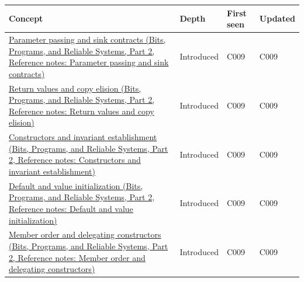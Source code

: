 {\def\LTcaptype{none} %
\begin{longtable}[]{@{}
  >{\raggedright\arraybackslash}p{}
  >{\raggedright\arraybackslash}p{}
  >{\raggedright\arraybackslash}p{}
  >{\raggedright\arraybackslash}p{}@{}}
\toprule\noalign{}
\begin{minipage}[b]{\linewidth}\raggedright
Concept
\end{minipage} & \begin{minipage}[b]{\linewidth}\raggedright
Depth
\end{minipage} & \begin{minipage}[b]{\linewidth}\raggedright
First seen
\end{minipage} & \begin{minipage}[b]{\linewidth}\raggedright
Updated
\end{minipage} \\
\midrule\noalign{}
\endhead
\bottomrule\noalign{}
\endlastfoot
\href{../01-Bits-Programs-and-Reliable-Systems-P02/main.pdf\#nameddest=appendix-d5908f75721f}{Parameter passing and sink contracts (Bits, Programs, and Reliable Systems, Part 2, Reference notes: Parameter passing and sink contracts)} & Introduced & C009 & C009 \\
\href{../01-Bits-Programs-and-Reliable-Systems-P02/main.pdf\#nameddest=appendix-b08d3788c5c6}{Return values and copy elision (Bits, Programs, and Reliable Systems, Part 2, Reference notes: Return values and copy elision)} & Introduced & C009 & C009 \\
\href{../01-Bits-Programs-and-Reliable-Systems-P02/main.pdf\#nameddest=appendix-7f8ec83d0886}{Constructors and invariant establishment (Bits, Programs, and Reliable Systems, Part 2, Reference notes: Constructors and invariant establishment)} & Introduced & C009 & C009 \\
\href{../01-Bits-Programs-and-Reliable-Systems-P02/main.pdf\#nameddest=appendix-ba8c1a9fe03f}{Default and value initialization (Bits, Programs, and Reliable Systems, Part 2, Reference notes: Default and value initialization)} & Introduced & C009 & C009 \\
\href{../01-Bits-Programs-and-Reliable-Systems-P02/main.pdf\#nameddest=appendix-3cb49709605a}{Member order and delegating constructors (Bits, Programs, and Reliable Systems, Part 2, Reference notes: Member order and delegating constructors)} & Introduced & C009 & C009 \\

\end{longtable}}
